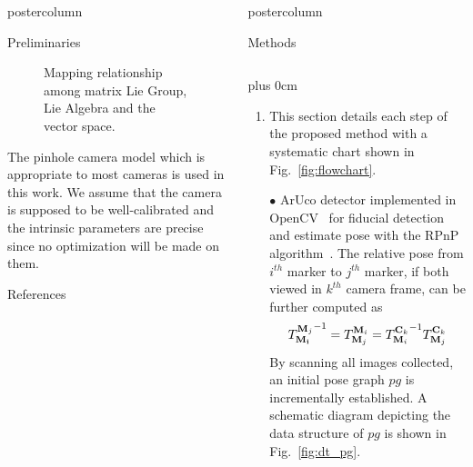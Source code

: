 \documentclass{beamer}
\newlength{\columnheight}
\renewcommand{\raggedright}{\leftskip=0pt \rightskip=0pt plus 0cm}
\begin{document}
\begin{frame}
\begin{columns}
\begin{column}{.4\textwidth}
\begin{beamercolorbox}[center]{postercolumn}
\begin{minipage}{.98\textwidth}
{\begin{myblock}{Preliminaries}
\begin{figure}
\begin{minipage}{0.45\textwidth}
								\caption{Mapping relationship among matrix Lie Group, Lie Algebra and the vector space.}
							\end{minipage}
						\end{figure}
\vspace{1em}
The pinhole camera model which is appropriate to most cameras is used in this work. We assume that the camera is supposed to be well-calibrated and the intrinsic parameters are precise since no optimization will be made on them.  

\end{myblock}


					\begin{myblock}{References}
						\footnotesize
						
						
					\end{myblock}\vfill

		}\end{minipage}\end{beamercolorbox}
	\end{column}
	\begin{column}{.57\textwidth}
		\begin{beamercolorbox}[center]{postercolumn}
			\begin{minipage}{.98\textwidth} %
				\parbox[t][\columnheight]{\textwidth}{ %
					\begin{myblock}{Methods}
\vspace{1em}
\begin{minipage}[0.3\textheight]{\textwidth}
\begin{columns}[T]
\begin{column}{0.5\textwidth}
\raggedright
\begin{enumerate}[label=,labelindent=\parindent,leftmargin=*]
\item This section details each step of the proposed method with a systematic chart shown in Fig.~\ref{fig:flowchart}.

\item[$\bullet$] ArUco detector implemented in OpenCV~\cite{aurcodetector} for fiducial detection and estimate pose with the RPnP algorithm~\cite{li2012robust}. The relative pose from $i^{th}$ marker to $j^{th}$ marker, if both viewed in $k^{th}$ camera frame, can be further computed as
\begin{equation}
{T_{\bold{M_i}}^{\bold{M}_j}}^{-1} = {T_{\bold{M}_j}^{\bold{M}_i}} = {T_{\bold{M}_i}^{\bold{C}_k}}^{-1}T_{\bold{M}_j}^{\bold{C}_k}
\end{equation}
By scanning all images collected, an initial pose graph $pg$ is incrementally established. A schematic diagram depicting the data structure of $pg$ is shown in Fig.~\ref{fig:dt_pg}.  


\end{enumerate}
\end{column}
\end{columns}
\end{minipage}
\end{myblock}}
\end{minipage}
\end{beamercolorbox}
\end{column}
\end{columns}
\end{frame}
\end{document}
